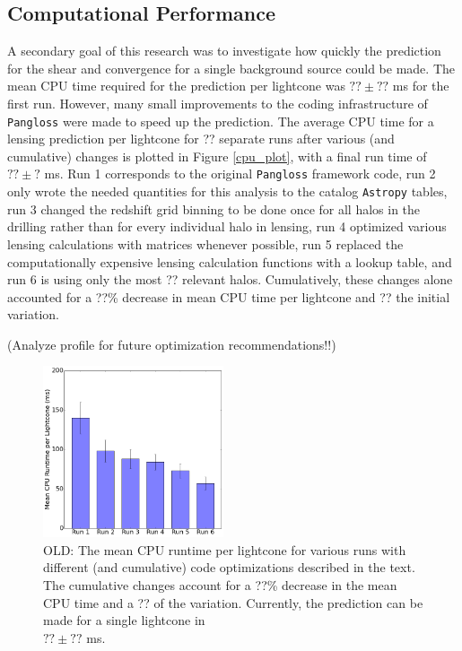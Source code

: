 \documentclass[%
 reprint,
 amsmath,amssymb,
 aps,nofootinbib
]{revtex4-1}
\begin{document}
\subsection{Computational Performance}

A secondary goal of this research was to investigate how quickly the prediction for the shear and convergence for a single background source could be made. The mean CPU time required for the prediction per lightcone was ${??\pm??}$ ms for the first run. However, many small improvements to the coding infrastructure of \texttt{Pangloss} were made to speed up the prediction. The average CPU time for a lensing prediction per lightcone for ?? separate runs after various (and cumulative) changes is plotted in Figure \ref{cpu_plot}, with a final run time of $??\pm?$ ms. Run 1 corresponds to the original \texttt{Pangloss} framework code, run 2 only wrote the needed quantities for this analysis to the catalog \texttt{Astropy} tables, run 3 changed the redshift grid binning to be done once for all halos in the drilling rather than for every individual halo in lensing, run 4 optimized various lensing calculations with matrices whenever possible, run 5 replaced the computationally expensive lensing calculation functions with a lookup table, and run 6 is using only the most ?? relevant halos. Cumulatively, these changes alone accounted for a ??\% decrease in mean CPU time per lightcone and ?? the initial variation.

(Analyze profile for future optimization recommendations!!)

\begin{figure}
    \centering
    \includegraphics[width=0.475\textwidth]{figs-swe/thesis/profile_bar.png}
    \captionsetup{justification=raggedright,singlelinecheck=false}
    \caption{OLD: The mean CPU runtime per lightcone for various runs with different (and cumulative) code optimizations described in the text. The cumulative changes account for a ??\% decrease in the mean CPU time and a ?? of the variation. Currently, the prediction can be made for a single lightcone in\\$??\pm??$ ms.}
    \label{fig:cpu_plot}
\end{figure}
\end{document}
